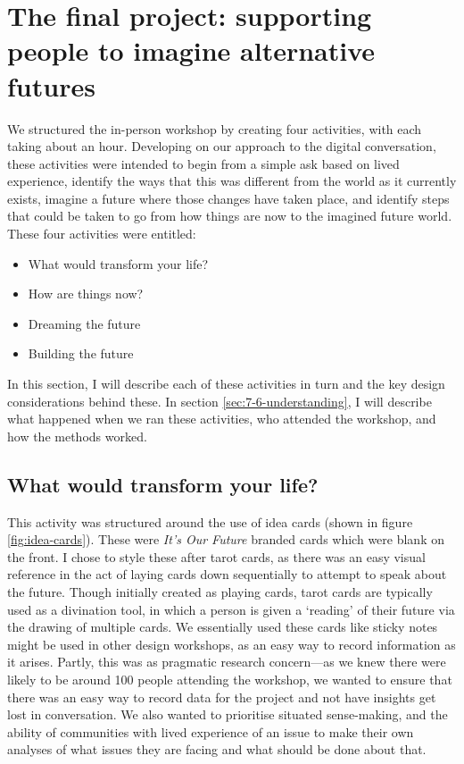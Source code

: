 \section{The final project: supporting people to imagine alternative futures }
\label{sec:7-5-final}
We structured the in-person workshop by creating four activities, with each taking about an hour. Developing on our approach to the digital conversation, these activities were intended to begin from a simple ask based on lived experience, identify the ways that this was different from the world as it currently exists, imagine a future where those changes have taken place, and identify steps that could be taken to go from how things are now to the imagined future world. These four activities were entitled:
\begin{itemize}
    \item What would transform your life?
    \item How are things now?
    \item Dreaming the future
    \item Building the future
\end{itemize}
In this section, I will describe each of these activities in turn and the key design considerations behind these. In section \ref{sec:7-6-understanding}, I will describe what happened when we ran these activities, who attended the workshop, and how the methods worked.

\subsection{What would transform your life?}
This activity was structured around the use of idea cards (shown in figure \ref{fig:idea-cards}). These were \textit{It's Our Future} branded cards which were blank on the front. I chose to style these after tarot cards, as there was an easy visual reference in the act of laying cards down sequentially to attempt to speak about the future.  Though initially created as playing cards, tarot cards are typically used as a divination tool, in which a person is given a `reading' of their future via the drawing of multiple cards. We essentially used these cards like sticky notes might be used in other design workshops, as an easy way to record information as it arises. Partly, this was as pragmatic research concern—as we knew there were likely to be around 100 people attending the workshop, we wanted to ensure that there was an easy way to record data for the project and not have insights get lost in conversation. We also wanted to prioritise situated sense-making, and the ability of communities with lived experience of an issue to make their own analyses of what issues they are facing and what should be done about that. 

